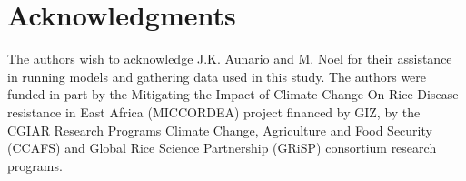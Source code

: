\documentclass[preprint,review,12pt]{elsarticle}
\begin{document}
    \section{Acknowledgments}
    The authors wish to acknowledge J.K. Aunario and M. Noel for their assistance in running models and gathering data used in this study. The authors were funded in part by the Mitigating the Impact of Climate Change On Rice Disease resistance in East Africa (MICCORDEA) project financed by GIZ, by the CGIAR Research Programs Climate Change, Agriculture and Food Security (CCAFS) and Global Rice Science Partnership (GRiSP) consortium research programs.
    
    
    
    
    
    
    
    
    
    
    
    
    
    
    
    
    
\end{document}
